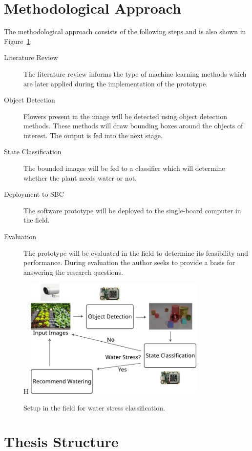 \documentclass[draft,final]{vutinfth} %
\begin{document}
\section{Methodological Approach}
\label{sec:methods}

The methodological approach consists of the following steps and is
also shown in Figure~\ref{fig:setup}:

\begin{description}
\item[Literature Review] The literature review informs the type of
  machine learning methods which are later applied during the
  implementation of the prototype.
\item[Object Detection] Flowers present in the image will be detected
  using object detection methods. These methods will draw bounding
  boxes around the objects of interest. The output is fed into the
  next stage.
\item[State Classification] The bounded images will be fed to a
  classifier which will determine whether the plant needs water or
  not.
\item[Deployment to SBC] The software prototype will be deployed to
  the single-board computer in the field.
\item[Evaluation] The prototype will be evaluated in the field to
  determine its feasibility and performance. During evaluation the
  author seeks to provide a basis for answering the research
  questions.
\end{description}

\begin{figure}{H}
  \centering
  \includegraphics[width=0.8\textwidth]{graphics/setup.pdf}
  \caption{Setup in the field for water stress classification.}
  \label{fig:setup}
\end{figure}

\section{Thesis Structure}
\label{sec:structure}
\end{document}
